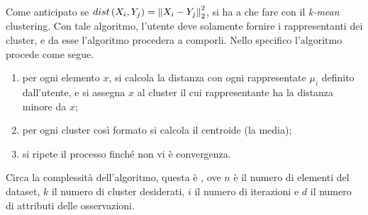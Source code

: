 \documentclass{subfiles}
\begin{document}
Come anticipato se $dist\left(X_{i}, Y_{j}\right) = \Norm{X_{i} - Y_{j}}[2]^{2}$, si ha a che fare con il \emph{k-mean} clustering.
Con tale algoritmo, l'utente deve solamente fornire i rappresentanti dei cluster, e da esse l'algoritmo procedera a comporli.
Nello specifico l'algoritmo procede come segue.
\begin{enumerate}
    \item per ogni elemento $x$, si calcola la distanza con ogni rappresentate \(\mu_{i}\) definito dall'utente,
          e si assegna $x$ al cluster il cui rappresentante ha la distanza minore da $x$;
    \item per ogni cluster così formato si calcola il centroide (la media);
    \item si ripete il processo finché non vi è convergenza\footnotemark[2].
\end{enumerate}

Circa la complessità dell'algoritmo, questa è , ove $n$ è il numero di elementi del dataset, $k$ il numero di cluster desiderati,
$i$ il numero di iterazioni e $d$ il numero di attributi delle osservazioni.
\end{document}
